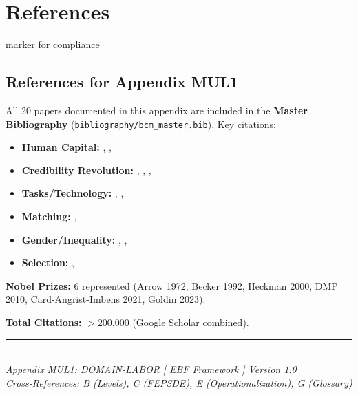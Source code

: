 \section{References}

\nocite{bcm_master}
 marker for compliance
\subsection{References for Appendix MUL1}
\label{sec:aa-references}

All 20 papers documented in this appendix are included in the \textbf{Master Bibliography}
(\texttt{bibliography/bcm\_master.bib}). Key citations:

\begin{itemize}[noitemsep]
    \item \textbf{Human Capital:} \cite{becker1962}, \cite{mincer1974}, \cite{arrow1962lbd}
    \item \textbf{Credibility Revolution:} \cite{cardkrueger1994}, \cite{card1990}, \cite{angristkrueger1991}, \cite{imbensangrist1994}
    \item \textbf{Tasks/Technology:} \cite{alm2003}, \cite{acemogluautor2011}, \cite{autor2008}
    \item \textbf{Matching:} \cite{diamond1982}, \cite{mortensenpissarides1994}
    \item \textbf{Gender/Inequality:} \cite{goldin2014}, \cite{goldinkatz2008}, \cite{katzmurphy1992}
    \item \textbf{Selection:} \cite{heckman1979}, \cite{heckman2006}
\end{itemize}

\textbf{Nobel Prizes:} 6 represented (Arrow 1972, Becker 1992, Heckman 2000, DMP 2010, Card-Angrist-Imbens 2021, Goldin 2023).

\textbf{Total Citations:} $>$200,000 (Google Scholar combined).

\vfill
\begin{center}
\rule{0.8\textwidth}{0.4pt}\\[0.5em]
\textit{Appendix MUL1: DOMAIN-LABOR | EBF Framework | Version 1.0}\\
\textit{Cross-References: B (Levels), C (FEPSDE), E (Operationalization), G (Glossary)}
\end{center}

